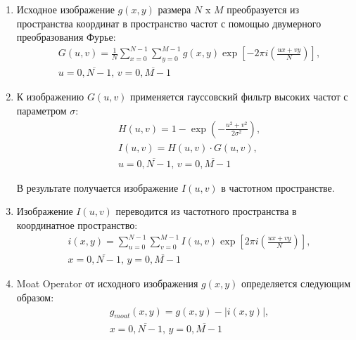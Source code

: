 \documentclass[12pt,fleqn]{article}
\begin{document}
\begin{enumerate} 
\item Исходное изображение $g(x, y)$ размера $N$ x $M$ преобразуется из пространства координат в пространство частот с помощью двумерного преобразования Фурье:
\begin{equation}
\begin{split}
	&G(u, v) = \frac{1}{N} \sum\limits_{x=0}^{N - 1} \sum\limits_{y=0}^{M - 1} g(x, y) \exp\left[  -2\pi i \left( \frac{ux + vy}{N} \right) \right], \\ \nonumber
	&u =\overline{0, N - 1},\, v = \overline{0, M - 1}
\end{split}
\end{equation}

\item К изображению $G(u, v)$ применяется гауссовский фильтр высоких частот с параметром $\sigma$:
\begin{equation}
\begin{split}
	&H(u, v) = 1 - \exp\left( -\frac{u^2 + v^2}{2\sigma^2} \right), \\ \nonumber
	&I(u, v) = H(u, v) \cdot G(u, v), \\
	&u =\overline{0, N - 1}, \,v = \overline{0, M - 1}
\end{split}
\end{equation}

В результате получается изображение $I(u, v)$ в частотном пространстве.
\item Изображение $I(u, v)$ переводится из частотного пространства в координатное пространство:
\begin{equation}
\begin{split}
	&i(x, y) = \sum\limits_{u=0}^{N - 1} \sum\limits_{v=0}^{M - 1} I(u, v) \exp\left[  2\pi i \left( \frac{ux + vy}{N} \right) \right], \\ \nonumber
	&x =\overline{0, N - 1},\, y = \overline{0, M - 1}
\end{split}
\end{equation}

\item Moat Operator от исходного изображения $g(x, y)$ определяется следующим образом:
\begin{equation}
\begin{split}
	&g_{moat}(x, y) = g(x, y) - |i(x, y)|, \\ \nonumber
	&x =\overline{0, N - 1},\, y = \overline{0, M - 1}
\end{split}
\end{equation}
\end{enumerate}
\end{document}
